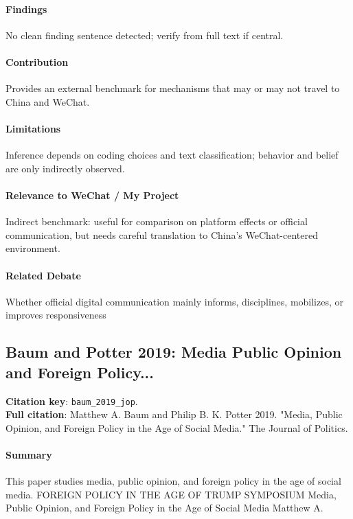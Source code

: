 \documentclass[12pt]{article}
\begin{document}
\paragraph{Findings} No clean finding sentence detected; verify from full text if central.

\paragraph{Contribution} Provides an external benchmark for mechanisms that may or may not travel to China and WeChat.

\paragraph{Limitations} Inference depends on coding choices and text classification; behavior and belief are only indirectly observed.

\paragraph{Relevance to WeChat / My Project} Indirect benchmark: useful for comparison on platform effects or official communication, but needs careful translation to China's WeChat-centered environment.

\paragraph{Related Debate} Whether official digital communication mainly informs, disciplines, mobilizes, or improves responsiveness


\subsection{Baum and Potter 2019: Media Public Opinion and Foreign Policy...}
\textbf{Citation key}: \texttt{baum\_2019\_jop}.\\
\textbf{Full citation}: Matthew A. Baum and Philip B. K. Potter 2019. "Media, Public Opinion, and Foreign Policy in the Age of Social Media." The Journal of Politics.

\paragraph{Summary} This paper studies media, public opinion, and foreign policy in the age of social media. FOREIGN POLICY IN THE AGE OF TRUMP SYMPOSIUM Media, Public Opinion, and Foreign Policy in the Age of Social Media Matthew A.
\end{document}
